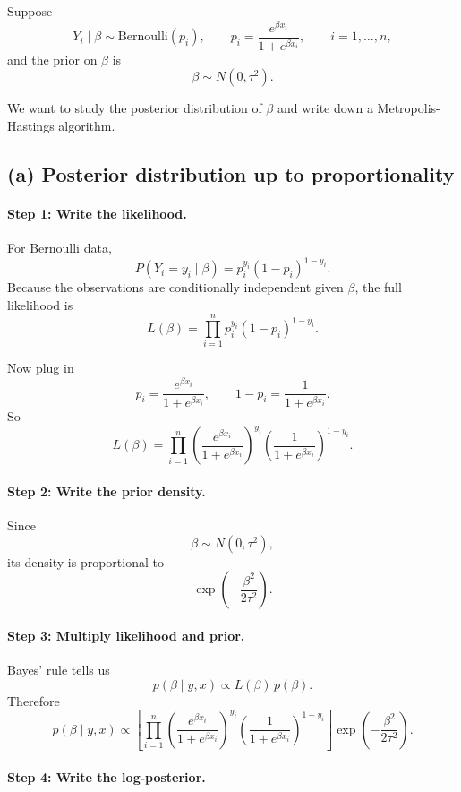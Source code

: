 \documentclass[11pt]{article}
\begin{document}
Suppose
\[
Y_i\mid \beta \sim \text{Bernoulli}(p_i),
\qquad
p_i=\frac{e^{\beta x_i}}{1+e^{\beta x_i}},
\qquad i=1,\dots,n,
\]
and the prior on $\beta$ is
\[
\beta \sim N(0,\tau^2).
\]

We want to study the posterior distribution of $\beta$ and write down a Metropolis-Hastings algorithm.

\subsection*{(a) Posterior distribution up to proportionality}

\paragraph{Step 1: Write the likelihood.}

For Bernoulli data,
\[
P(Y_i=y_i\mid \beta)=p_i^{y_i}(1-p_i)^{1-y_i}.
\]
Because the observations are conditionally independent given $\beta$, the full likelihood is
\[
L(\beta)
=
\prod_{i=1}^n p_i^{y_i}(1-p_i)^{1-y_i}.
\]

Now plug in
\[
p_i=\frac{e^{\beta x_i}}{1+e^{\beta x_i}},
\qquad
1-p_i=\frac{1}{1+e^{\beta x_i}}.
\]
So
\[
L(\beta)
=
\prod_{i=1}^n
\left(\frac{e^{\beta x_i}}{1+e^{\beta x_i}}\right)^{y_i}
\left(\frac{1}{1+e^{\beta x_i}}\right)^{1-y_i}.
\]

\paragraph{Step 2: Write the prior density.}

Since
\[
\beta\sim N(0,\tau^2),
\]
its density is proportional to
\[
\exp\left(-\frac{\beta^2}{2\tau^2}\right).
\]

\paragraph{Step 3: Multiply likelihood and prior.}

Bayes' rule tells us
\[
p(\beta\mid y,x)\propto L(\beta)\,p(\beta).
\]
Therefore
\[
\boxed{
p(\beta\mid y,x)\propto
\left[
\prod_{i=1}^n
\left(\frac{e^{\beta x_i}}{1+e^{\beta x_i}}\right)^{y_i}
\left(\frac{1}{1+e^{\beta x_i}}\right)^{1-y_i}
\right]
\exp\left(-\frac{\beta^2}{2\tau^2}\right).
}
\]

\paragraph{Step 4: Write the log-posterior.}
\end{document}
